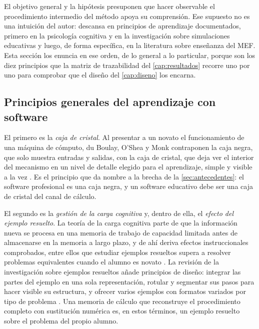 El objetivo general y la hipótesis presuponen que hacer observable el procedimiento intermedio del método apoya su comprensión. Ese supuesto no es una intuición del autor: descansa en principios de aprendizaje documentados, primero en la psicología cognitiva y en la investigación sobre simulaciones educativas y luego, de forma específica, en la literatura sobre enseñanza del MEF. Esta sección los enuncia en ese orden, de lo general a lo particular, porque son los diez principios que la matriz de trazabilidad del \autoref{cap:resultados} recorre uno por uno para comprobar que el diseño del \autoref{cap:diseno} los encarna.

\subsection{Principios generales del aprendizaje con software}
\label{sec:principios-generales}

El primero es la \emph{caja de cristal}. Al presentar a un novato el funcionamiento de una máquina de cómputo, du Boulay, O'Shea y Monk contraponen la caja negra, que solo muestra entradas y salidas, con la caja de cristal, que deja ver el interior del mecanismo en un nivel de detalle elegido para el aprendizaje, simple y visible a la vez \autocite{duboulay1981blackbox}. %
Es el principio que da nombre a la brecha de la \autoref{sec:antecedentes}: el software profesional es una caja negra, y un software educativo debe ser una caja de cristal del canal de cálculo.

El segundo es la \emph{gestión de la carga cognitiva} y, dentro de ella, el \emph{efecto del ejemplo resuelto}. La teoría de la carga cognitiva parte de que la información nueva se procesa en una memoria de trabajo de capacidad limitada antes de almacenarse en la memoria a largo plazo, y de ahí deriva efectos instruccionales comprobados, entre ellos que estudiar ejemplos resueltos supera a resolver problemas equivalentes cuando el alumno es novato \autocite{sweller2019cognitive}. %
La revisión de la investigación sobre ejemplos resueltos añade principios de diseño: integrar las partes del ejemplo en una sola representación, rotular y segmentar sus pasos para hacer visible su estructura, y ofrecer varios ejemplos con formatos variados por tipo de problema \autocite{atkinson2000learning}. %
Una memoria de cálculo que reconstruye el procedimiento completo con sustitución numérica es, en estos términos, un ejemplo resuelto sobre el problema del propio alumno.

